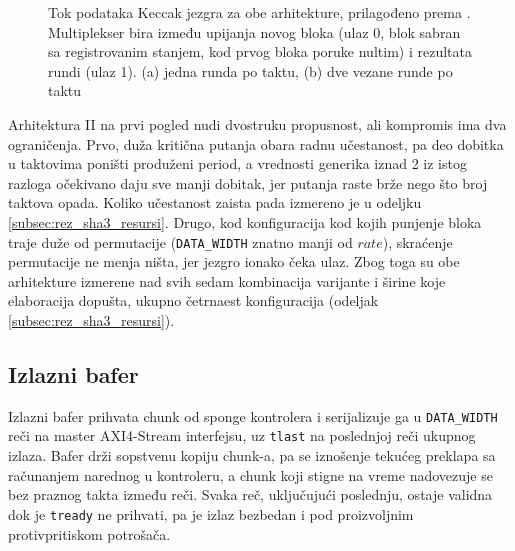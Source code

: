 \begin{figure}[H]
{
}
\caption[Tok podataka Keccak jezgra za obe arhitekture]{Tok podataka Keccak jezgra za obe arhitekture, prilagođeno prema \cite{sundal_chaves}. Multiplekser bira između upijanja novog bloka (ulaz 0, blok sabran sa registrovanim stanjem, kod prvog bloka poruke nultim) i rezultata rundi (ulaz 1). (a) jedna runda po taktu, (b) dve vezane runde po taktu}
\label{fig:sha3_dve_real}
\end{figure}

Arhitektura II na prvi pogled nudi dvostruku propusnost, ali kompromis ima dva ograničenja. Prvo, duža kritična putanja obara radnu učestanost, pa deo dobitka u taktovima poništi produženi period, a vrednosti generika iznad 2 iz istog razloga očekivano daju sve manji dobitak, jer putanja raste brže nego što broj taktova opada. Koliko učestanost zaista pada izmereno je u odeljku \ref{subsec:rez_sha3_resursi}. Drugo, kod konfiguracija kod kojih punjenje bloka traje duže od permutacije (\texttt{DATA\_WIDTH} znatno manji od $rate$), skraćenje permutacije ne menja ništa, jer jezgro ionako čeka ulaz. Zbog toga su obe arhitekture izmerene nad svih sedam kombinacija varijante i širine koje elaboracija dopušta, ukupno četrnaest konfiguracija (odeljak \ref{subsec:rez_sha3_resursi}).

\subsection{Izlazni bafer}
\label{subsec:hw_sha3_ob}

Izlazni bafer prihvata chunk od sponge kontrolera i serijalizuje ga u \texttt{DATA\_WIDTH} reči na master AXI4-Stream interfejsu, uz \texttt{tlast} na poslednjoj reči ukupnog izlaza. Bafer drži sopstvenu kopiju chunk-a, pa se iznošenje tekućeg preklapa sa računanjem narednog u kontroleru, a chunk koji stigne na vreme nadovezuje se bez praznog takta između reči. Svaka reč, uključujući poslednju, ostaje validna dok je \texttt{tready} ne prihvati, pa je izlaz bezbedan i pod proizvoljnim protivpritiskom potrošača.


